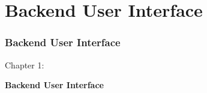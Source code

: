 %

\section{Backend User Interface}
\begin{frame}[fragile]
	\frametitle{Backend User Interface}

	\begin{center}\huge{Chapter 1:}\end{center}
	\begin{center}\huge{\color{typo3darkgrey}\textbf{Backend User Interface}}\end{center}

\end{frame}

